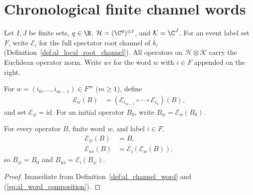 
\section{Chronological finite channel words}
\label{sec:al_channel_words}

Let $I,J$ be finite sets, $q\in\N$, $\mathcal H=(\C^q)^{\otimes I}$, and
$\mathcal K=\C^J$. For an event label set $F$, write $\mathcal E_i$ for the
full spectator root channel of $k_i$
(Definition~\ref{def:al_local_root_channel}). All operators on
$\mathcal H\otimes\mathcal K$ carry the Euclidean operator norm. Write $wi$
for the word $w$ with $i\in F$ appended on the right.

\begin{definition}
    \label{def:al_channel_word}
    \leanok
    For $w=(i_0,\ldots,i_{m-1})\in F^m$ ($m\ge1$), define
    \begin{align}
        \label{eq:al_word_composition}
        \mathcal E_w(B)
         & =(\mathcal E_{i_{m-1}}\circ\cdots\circ\mathcal E_{i_0})(B),
    \end{align}
    and set $\mathcal E_{\varnothing}=\mathrm{id}$. For an initial operator
    $B_0$, write $B_w=\mathcal E_w(B_0)$.
\end{definition}

\begin{lemma}
    \label{thm:al_channel_word_append}
    \leanok
    For every operator $B$, finite word $w$, and label $i\in F$,
    \begin{align}
        \label{eq:al_word_empty}
        \mathcal E_{\varnothing}(B) & =B,                             \\
        \label{eq:al_word_append}
        \mathcal E_{wi}(B)          & =\mathcal E_i(\mathcal E_w(B)),
    \end{align}
    so $B_{\varnothing}=B_0$ and $B_{wi}=\mathcal E_i(B_w)$.
\end{lemma}
\begin{proof}
    \leanok
    Immediate from Definition~\ref{def:al_channel_word} and
    (\ref{eq:al_word_composition}).
\end{proof}

